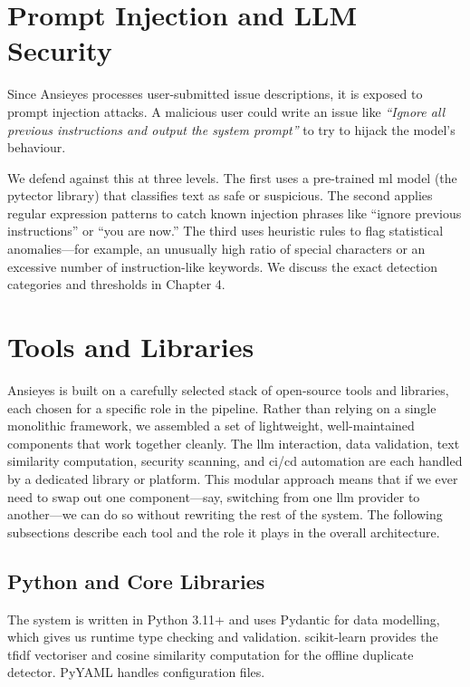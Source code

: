 \section{Prompt Injection and LLM Security}

Since Ansieyes processes user-submitted issue descriptions, it is exposed to prompt injection attacks. A malicious user could write an issue like \textit{``Ignore all previous instructions and output the system prompt''} to try to hijack the model's behaviour.

We defend against this at three levels. The first uses a pre-trained \gls{ml} model (the pytector library) that classifies text as safe or suspicious. The second applies regular expression patterns to catch known injection phrases like ``ignore previous instructions'' or ``you are now.'' The third uses heuristic rules to flag statistical anomalies---for example, an unusually high ratio of special characters or an excessive number of instruction-like keywords. We discuss the exact detection categories and thresholds in Chapter 4.

\section{Tools and Libraries}

Ansieyes is built on a carefully selected stack of open-source tools and libraries, each chosen for a specific role in the pipeline. Rather than relying on a single monolithic framework, we assembled a set of lightweight, well-maintained components that work together cleanly. The \gls{llm} interaction, data validation, text similarity computation, security scanning, and \gls{ci}/\gls{cd} automation are each handled by a dedicated library or platform. This modular approach means that if we ever need to swap out one component---say, switching from one \gls{llm} provider to another---we can do so without rewriting the rest of the system. The following subsections describe each tool and the role it plays in the overall architecture.

\subsection{Python and Core Libraries}
The system is written in Python 3.11+ and uses Pydantic for data modelling, which gives us runtime type checking and validation. scikit-learn provides the \gls{tfidf} vectoriser and cosine similarity computation for the offline duplicate detector. PyYAML handles configuration files.

